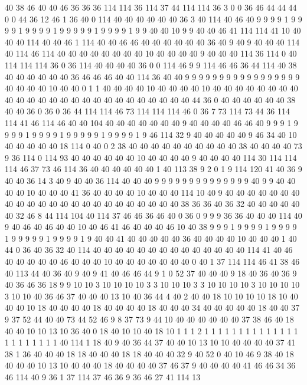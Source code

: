 40 38 46 40 40 46 36 36 36 114 114 36 114 37 44 114 114 36 3 0
0 36 46 44 44 44 0 0 44 36 12 46 1 36 40 0 114 40 40 40
40 40 40 36 3 40 114 40 46 40 9 9 9 9 1 9 9 9 9 1
9 9 9 9 1 9 9 9 9 9 1 9 9 9 9 1 9 9 40 40
10 9 9 40 40 46 41 114 114 41 10 40 40 40 114 40 40 46 1 114
40 40 46 46 40 40 40 40 40 40 36 40 9 40 9 40 40 40 114 40
114 46 114 40 40 40 40 40 40 40 40 10 40 40 40 40 9 40 40 40
114 36 114 0 40 114 114 114 36 0 36 114 40 40 40 40 36 0 0 114
46 9 9 114 46 46 36 44 114 40 38 40 40 40 40 40 40 36 46 46
46 40 40 114 36 40 40 9 9 9 9 9 9 9 9 9 9 9 9 9
9 9 9 9 40 40 40 40 10 40 40 0 1 1 40 40 40 40 10 40
40 40 40 10 40 40 40 40 40 40 40 40 40 40 40 40 40 40 40 40
40 40 40 40 40 40 40 40 40 44 36 0 40 40 40 40 40 40 38 40
40 36 0 36 0 36 44 114 114 46 73 114 114 114 46 0 36 7 73 114
73 44 36 114 114 41 46 114 46 40 40 104 40 40 40 40 40 40 40 9
40 40 40 40 46 46 40 9 9 9 1 9 9 9 9 1 9 9 9 9
1 9 9 9 9 9 1 9 9 9 9 1 9 46 114 32 9 40 40 40
40 40 9 46 34 40 10 40 40 40 40 40 18 114 0 40 0 2 38 40
40 40 40 40 40 40 40 40 40 38 40 40 40 40 73 9 36 114 0 114
93 40 40 40 40 40 40 10 40 40 40 40 9 40 40 40 40 114 30 114
114 114 46 37 73 46 114 36 40 40 40 40 40 40 1 40 113 38 9 2
0 1 9 114 120 41 40 36 9 40 40 36 14 3 40 9 40 40 36 114
40 40 40 9 9 9 9 9 9 9 9 9 9 9 9 9 9 40 9 9
40 40 40 40 10 40 40 40 41 36 40 40 40 40 10 40 40 40 114 10
40 9 40 40 40 40 40 40 40 40 40 40 40 40 40 40 40 40 40 40
40 40 40 40 40 38 36 36 40 36 32 40 40 40 40 40 40 32 46 8
44 114 104 40 114 37 46 46 36 46 40 0 36 0 9 9 9 36 36 40
40 40 114 40 9 40 46 40 46 40 40 10 40 46 41 46 40 40 40 46
10 40 38 9 9 9 1 9 9 9 9 1 9 9 9 9 1 9 9 9
9 9 1 9 9 9 9 1 9 40 40 41 40 40 40 40 40 36 40 40
40 40 10 40 40 40 1 40 44 0 36 40 36 32 40 114 40 40 40 40
40 40 40 40 40 40 40 40 40 40 114 41 40 46 40 40 40 40 40 46
40 40 40 10 40 40 40 40 40 40 40 0 40 1 37 114 114 46 41 38
46 40 113 44 40 36 40 9 40 9 41 40 46 46 44 9 1 0 52 37
40 40 40 9 18 40 36 40 36 9 40 36 46 36 18 9 9 10 10 3
10 10 10 10 3 3 10 10 10 3 3 10 10 10 10 3 10 10 10 10
3 10 10 40 36 46 37 40 40 40 13 10 40 36 44 4 40 2 40 40
18 10 10 10 10 18 10 40 40 40 10 18 40 40 40 40 18 40 40 40
40 18 40 40 40 34 40 40 40 40 40 18 40 40 37 9 37 52 44 40
40 73 44 52 46 9 8 37 73 9 44 10 40 40 40 40 40 40 37 38
46 40 18 40 40 10 10 13 10 36 40 0 18 40 10 10 40 18 10 1
1 1 2 1 1 1 1 1 1 1 1 1 1 1 1 1 1 1 1 1
1 1 1 1 1 40 114 1 18 40 9 40 36 44 37 40 40 10 13 10
10 40 40 40 40 37 41 38 1 36 40 40 40 18 18 40 40 40 18 18
40 40 40 32 9 40 52 0 40 10 46 9 38 40 18 40 40 40 10 13
10 40 40 40 18 40 40 40 40 37 46 37 9 40 40 40 40 41 46 46
34 36 46 114 40 9 36 1 37 114 37 46 36 9 36 46 27 41 114 13
